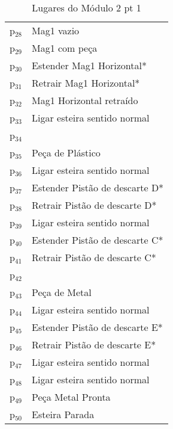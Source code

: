 \begin{table}[htbp]
\caption{Lugares do Módulo 2 pt 1}
\centering
\begin{tabular}{ll}
p\(_{\text{28}}\) & Mag1 vazio\\
p\(_{\text{29}}\) & Mag1 com peça\\
p\(_{\text{30}}\) & Estender Mag1 Horizontal*\\
p\(_{\text{31}}\) & Retrair Mag1 Horizontal*\\
p\(_{\text{32}}\) & Mag1 Horizontal retraído\\
p\(_{\text{33}}\) & Ligar esteira sentido normal\\
p\(_{\text{34}}\) & \\
p\(_{\text{35}}\) & Peça de Plástico\\
p\(_{\text{36}}\) & Ligar esteira sentido normal\\
p\(_{\text{37}}\) & Estender Pistão de descarte D*\\
p\(_{\text{38}}\) & Retrair Pistão de descarte D*\\
p\(_{\text{39}}\) & Ligar esteira sentido normal\\
p\(_{\text{40}}\) & Estender Pistão de descarte C*\\
p\(_{\text{41}}\) & Retrair Pistão de descarte C*\\
p\(_{\text{42}}\) & \\
p\(_{\text{43}}\) & Peça de Metal\\
p\(_{\text{44}}\) & Ligar esteira sentido normal\\
p\(_{\text{45}}\) & Estender Pistão de descarte E*\\
p\(_{\text{46}}\) & Retrair Pistão de descarte E*\\
p\(_{\text{47}}\) & Ligar esteira sentido normal\\
p\(_{\text{48}}\) & Ligar esteira sentido normal\\
p\(_{\text{49}}\) & Peça Metal Pronta\\
p\(_{\text{50}}\) & Esteira Parada\\
\end{tabular}
\end{table}


